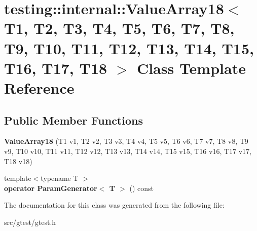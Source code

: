 \hypertarget{classtesting_1_1internal_1_1_value_array18}{}\section{testing\+:\+:internal\+:\+:Value\+Array18$<$ T1, T2, T3, T4, T5, T6, T7, T8, T9, T10, T11, T12, T13, T14, T15, T16, T17, T18 $>$ Class Template Reference}
\label{classtesting_1_1internal_1_1_value_array18}
\subsection*{Public Member Functions}
\begin{DoxyCompactItemize}
\item 
\mbox{\label{classtesting_1_1internal_1_1_value_array18_adf8554745ebde65aba76a7bc6c1a5a06}} 
{\bfseries Value\+Array18} (T1 v1, T2 v2, T3 v3, T4 v4, T5 v5, T6 v6, T7 v7, T8 v8, T9 v9, T10 v10, T11 v11, T12 v12, T13 v13, T14 v14, T15 v15, T16 v16, T17 v17, T18 v18)
\item 
\mbox{\label{classtesting_1_1internal_1_1_value_array18_a403e37450f8f4b21d38890d172ec57c0}} 
{\footnotesize template$<$typename T $>$ }\\{\bfseries operator Param\+Generator$<$ T $>$} () const
\end{DoxyCompactItemize}


The documentation for this class was generated from the following file\+:\begin{DoxyCompactItemize}
\item 
src/gtest/gtest.\+h\end{DoxyCompactItemize}
